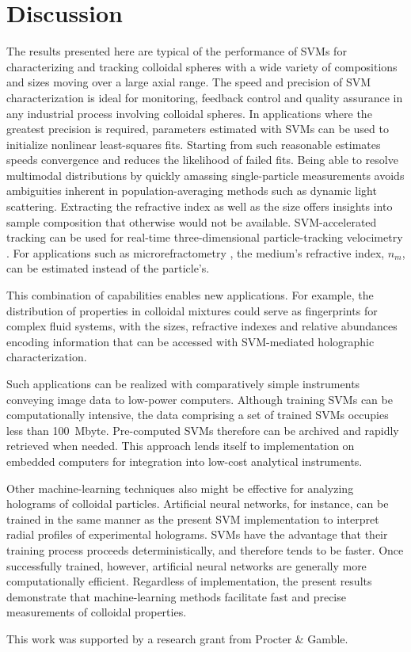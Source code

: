\section{Discussion}

The results presented here are typical of the performance of SVMs
for characterizing and tracking colloidal spheres with a wide
variety of compositions and sizes moving over a large axial range.
The speed and precision of SVM characterization
is ideal for monitoring, feedback control and quality assurance
in any industrial process involving colloidal spheres.
In applications where the greatest precision is required, parameters
estimated with SVMs can be used to initialize nonlinear least-squares
fits.
Starting from such reasonable estimates speeds convergence and
reduces the likelihood of failed fits.
Being able to resolve multimodal distributions
by quickly amassing single-particle measurements
avoids ambiguities inherent in population-averaging
methods such as dynamic light scattering.
Extracting the refractive index as well as the size offers
insights into sample composition that otherwise would
not be available.
SVM-accelerated tracking can be used for real-time
three-dimensional particle-tracking velocimetry \cite{cheong09}.
For applications such as microrefractometry \cite{shpaisman12},
the medium's refractive index, $n_m$, can 
be estimated instead of the particle's.

This combination of capabilities enables new applications.
For example, the distribution of properties in colloidal mixtures
could serve as fingerprints for complex fluid systems, with the
sizes, refractive indexes and relative abundances encoding information
that can be accessed with SVM-mediated holographic
characterization.

Such applications can be realized with comparatively
simple instruments \cite{krishnatreya14} conveying image data
to low-power computers.
Although training SVMs can be computationally intensive,
the data comprising a set of trained SVMs occupies less
than \SI{100}{\mega byte}.
Pre-computed SVMs therefore can be archived and rapidly
retrieved when needed.
This approach lends itself to
implementation on embedded computers for integration into
low-cost analytical instruments.

Other machine-learning techniques also might be effective
for analyzing holograms of colloidal particles.  Artificial
neural networks, for instance, can be trained in the same
manner as the present SVM implementation to interpret
radial profiles of experimental holograms.  SVMs have the advantage
that their training process proceeds deterministically, and therefore
tends to be faster.  Once successfully trained, however, artificial
neural networks are generally more computationally efficient.
Regardless of implementation, the present results demonstrate
that machine-learning methods facilitate
fast and precise measurements of colloidal properties.

This work was supported by a research grant from Procter \& Gamble.
